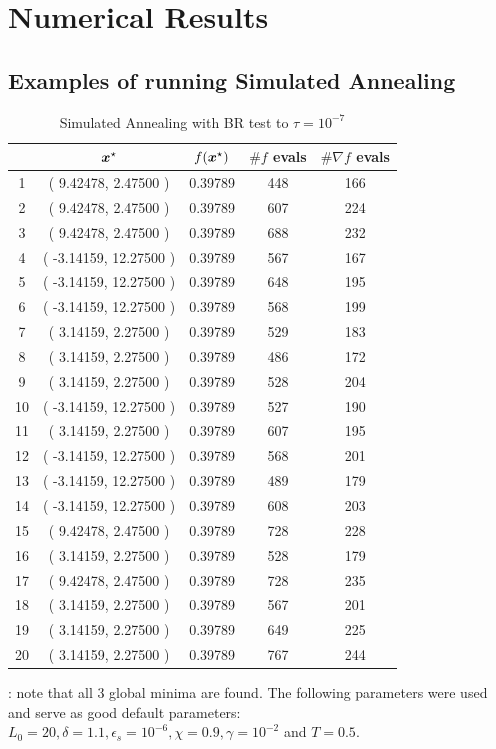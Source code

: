 \section{Numerical Results}
\label{sec:experiments}

\subsection{Examples of running Simulated Annealing}

\begin{table}[h]
    \center
    \caption{Simulated Annealing with BR test to $\tau=10^{-7}$}
    \label{table:run_example}
    \footnotesize
    \begin{tabular}{c|cc|cc}
& $\boldsymbol{x}^\star$ & $f(\boldsymbol{x}^\star)$ & $\# f$ evals & $\# \nabla f$ evals \\
\hline
1 & ( 9.42478, 2.47500 ) & 0.39789 & 448 & 166 \\
2 & ( 9.42478, 2.47500 ) & 0.39789 & 607 & 224 \\
3 & ( 9.42478, 2.47500 ) & 0.39789 & 688 & 232 \\
4 & ( -3.14159, 12.27500 ) & 0.39789 & 567 & 167 \\
5 & ( -3.14159, 12.27500 ) & 0.39789 & 648 & 195 \\
6 & ( -3.14159, 12.27500 ) & 0.39789 & 568 & 199 \\
7 & ( 3.14159, 2.27500 ) & 0.39789 & 529 & 183 \\
8 & ( 3.14159, 2.27500 ) & 0.39789 & 486 & 172 \\
9 & ( 3.14159, 2.27500 ) & 0.39789 & 528 & 204 \\
10 & ( -3.14159, 12.27500 ) & 0.39789 & 527 & 190 \\
11 & ( 3.14159, 2.27500 ) & 0.39789 & 607 & 195 \\
12 & ( -3.14159, 12.27500 ) & 0.39789 & 568 & 201 \\
13 & ( -3.14159, 12.27500 ) & 0.39789 & 489 & 179 \\
14 & ( -3.14159, 12.27500 ) & 0.39789 & 608 & 203 \\
15 & ( 9.42478, 2.47500 ) & 0.39789 & 728 & 228 \\
16 & ( 3.14159, 2.27500 ) & 0.39789 & 528 & 179 \\
17 & ( 9.42478, 2.47500 ) & 0.39789 & 728 & 235 \\
18 & ( 3.14159, 2.27500 ) & 0.39789 & 567 & 201 \\
19 & ( 3.14159, 2.27500 ) & 0.39789 & 649 & 225 \\
20 & ( 3.14159, 2.27500 ) & 0.39789 & 767 & 244 \\
    \end{tabular}
    
    \vspace{10pt}

    : note that all 3 global minima are found. The following parameters were used and serve as good
    default parameters: $L_0 = 20, \delta=1.1, \epsilon_s = 10^{-6}, \chi=0.9, \gamma=10^{-2}$ and
    $T=0.5$.
\end{table}

